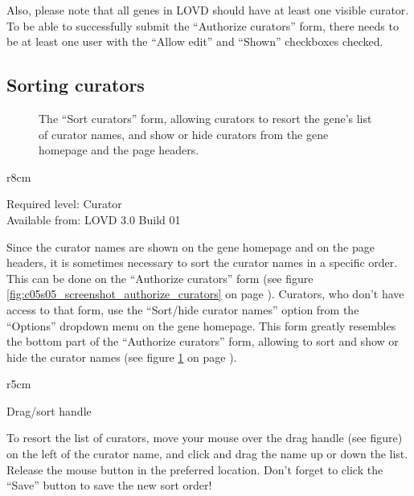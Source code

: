 Also, please note that all genes in LOVD should have at least one visible curator.
To be able to successfully submit the ``Authorize curators'' form, there needs to be at least one user with the ``Allow edit'' and ``Shown'' checkboxes checked.



\hypertarget{ssec:sorting_curators}{}
\subsection{Sorting curators}

\begin{figure}[ht]
  \begin{shaded}
  \caption{%
    The ``Sort curators'' form, allowing curators to resort the gene's list of curator names,
     and show or hide curators from the gene homepage and the page headers.}
  \label{fig:c05s05_screenshot_sort_curators}
  \end{shaded}
\end{figure}

\begin{wrapfigure}[3]{r}{8cm} %
  \vspace{-25pt}
  \begin{leftbar}
    Required level: Curator\\
    Available from: LOVD 3.0 Build 01
  \end{leftbar}
\end{wrapfigure}
Since the curator names are shown on the gene homepage and on the page headers, it is sometimes necessary to sort the curator names in a specific order.
This can be done on the ``Authorize curators'' form (see figure \ref{fig:c05s05_screenshot_authorize_curators}
 on page \pageref{fig:c05s05_screenshot_authorize_curators}).
Curators, who don't have access to that form, use the ``Sort/hide curator names'' option from the ``Options'' dropdown menu on the gene homepage.
This form greatly resembles the bottom part of the ``Authorize curators'' form, allowing to sort and show or
 hide the curator names (see figure \ref{fig:c05s05_screenshot_sort_curators} on page \pageref{fig:c05s05_screenshot_sort_curators}).

\begin{wrapfigure}[3]{r}{5cm} %
  \vspace{-25pt}
  \begin{framed}
     Drag/sort handle
  \end{framed}
\end{wrapfigure}
To resort the list of curators, move your mouse over the drag handle (see figure) on the left
 of the curator name, and click and drag the name up or down the list.
Release the mouse button in the preferred location.
Don't forget to click the ``Save'' button to save the new sort order!
\clearpage %










